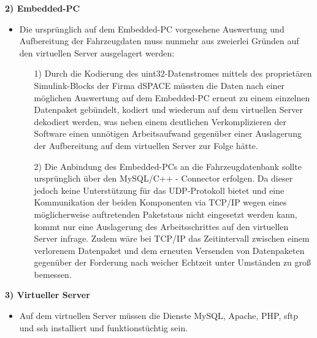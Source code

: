 \documentclass[fontsize = 12pt, paper = a4]{scrreprt}
\begin{document}
\textbf{2) Embedded-PC}

\begin{itemize}

\item Die ursprünglich auf dem Embedded-PC vorgesehene Auswertung und Aufbereitung der Fahrzeugdaten muss nunmehr aus zweierlei Gründen auf den virtuellen Server ausgelagert werden: \\

\begin{itemize}

\item[1)] Durch die Kodierung des uint32-Datenstromes mittels des proprietären Simulink-Blocks der Firma dSPACE müssten die Daten nach einer möglichen Auswertung auf dem Embedded-PC erneut zu einem einzelnen Datenpaket gebündelt, kodiert und wiederum auf dem virtuellen Server dekodiert werden, was neben einem deutlichen Verkomplizieren der Software einen unnötigen Arbeitsaufwand gegenüber einer Auslagerung der Aufbereitung auf dem virtuellen Server zur Folge hätte. \\

\item[2)] Die Anbindung des Embedded-PCs an die Fahrzeugdatenbank sollte ursprünglich über den MySQL/C++ - Connector erfolgen. Da dieser jedoch keine Unterstützung für das UDP-Protokoll bietet und eine Kommunikation der beiden Komponenten via TCP/IP wegen eines möglicherweise auftretenden Paketstaus nicht eingesetzt werden kann, kommt nur eine Auslagerung des Arbeitsschrittes auf den virtuellen Server infrage. Zudem wäre bei TCP/IP  das Zeitintervall zwischen einem verlorenem Datenpaket und dem erneuten Versenden von Datenpaketen gegenüber der Forderung nach weicher Echtzeit unter Umständen zu groß bemessen. \\

\end{itemize}

\end{itemize}

\newpage

\textbf{3) Virtueller Server}

\begin{itemize}

\item Auf dem virtuellen Server müssen die Dienste MySQL, Apache, PHP, sftp und ssh installiert und funktionstüchtig sein.  

\end{itemize}
\end{document}
